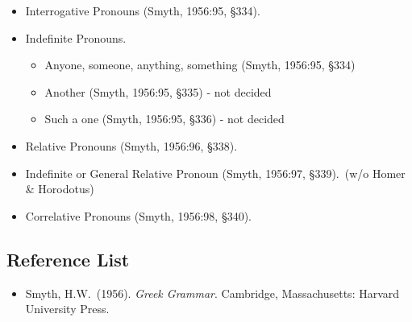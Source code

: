 \documentclass[10pt,a4paper,notitlepage]{article}
\begin{document}
\begin{itemize}
        \item Interrogative Pronouns (Smyth, 1956:95, \S334).
        \item Indefinite Pronouns.
        \begin{itemize}
            \item Anyone, someone, anything, something (Smyth, 1956:95, \S334)
            \item Another (Smyth, 1956:95, \S335) - not decided
            \item Such a one (Smyth, 1956:95, \S336) - not decided
        \end{itemize}
        \item Relative Pronouns (Smyth, 1956:96, \S338).
        \item Indefinite or General Relative Pronoun (Smyth, 1956:97, \S339).\ (w/o Homer \& Horodotus)
        \item Correlative Pronouns (Smyth, 1956:98, \S340).
    \end{itemize}

    \subsection*{Reference List}
    \begin{itemize}[label={}, leftmargin=0]
        \item Smyth, H.W.\ (1956). \textit{Greek Grammar}. Cambridge, Massachusetts: Harvard University Press.
    \end{itemize}
\end{document}
